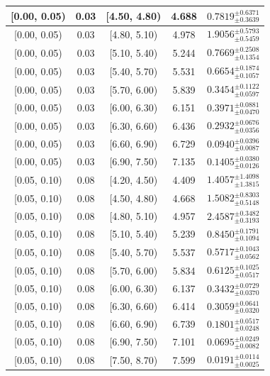\begin{longtable}{|c|c|c|c|c|}
\hline
\endlastfoot
[0.00, 0.05) & 0.03 & [4.50, 4.80) & 4.688 & $0.7819^{ \pm 0.6371 }_{ \pm 0.3639 }$ \\ 
\hline
[0.00, 0.05) & 0.03 & [4.80, 5.10) & 4.978 & $1.9056^{ \pm 0.5793 }_{ \pm 0.5459 }$ \\ 
\hline
[0.00, 0.05) & 0.03 & [5.10, 5.40) & 5.244 & $0.7669^{ \pm 0.2508 }_{ \pm 0.1354 }$ \\ 
\hline
[0.00, 0.05) & 0.03 & [5.40, 5.70) & 5.531 & $0.6654^{ \pm 0.1874 }_{ \pm 0.1057 }$ \\ 
\hline
[0.00, 0.05) & 0.03 & [5.70, 6.00) & 5.839 & $0.3454^{ \pm 0.1122 }_{ \pm 0.0597 }$ \\ 
\hline
[0.00, 0.05) & 0.03 & [6.00, 6.30) & 6.151 & $0.3971^{ \pm 0.0881 }_{ \pm 0.0470 }$ \\ 
\hline
[0.00, 0.05) & 0.03 & [6.30, 6.60) & 6.436 & $0.2932^{ \pm 0.0676 }_{ \pm 0.0356 }$ \\ 
\hline
[0.00, 0.05) & 0.03 & [6.60, 6.90) & 6.729 & $0.0940^{ \pm 0.0396 }_{ \pm 0.0087 }$ \\ 
\hline
[0.00, 0.05) & 0.03 & [6.90, 7.50) & 7.135 & $0.1405^{ \pm 0.0380 }_{ \pm 0.0126 }$ \\ 
\hline
[0.05, 0.10) & 0.08 & [4.20, 4.50) & 4.409 & $1.4057^{ \pm 1.4098 }_{ \pm 1.3815 }$ \\ 
\hline
[0.05, 0.10) & 0.08 & [4.50, 4.80) & 4.668 & $1.5082^{ \pm 0.8303 }_{ \pm 0.5148 }$ \\ 
\hline
[0.05, 0.10) & 0.08 & [4.80, 5.10) & 4.957 & $2.4587^{ \pm 0.3482 }_{ \pm 0.3193 }$ \\ 
\hline
[0.05, 0.10) & 0.08 & [5.10, 5.40) & 5.239 & $0.8450^{ \pm 0.1791 }_{ \pm 0.1094 }$ \\ 
\hline
[0.05, 0.10) & 0.08 & [5.40, 5.70) & 5.537 & $0.5717^{ \pm 0.1043 }_{ \pm 0.0562 }$ \\ 
\hline
[0.05, 0.10) & 0.08 & [5.70, 6.00) & 5.834 & $0.6125^{ \pm 0.1025 }_{ \pm 0.0517 }$ \\ 
\hline
[0.05, 0.10) & 0.08 & [6.00, 6.30) & 6.137 & $0.3432^{ \pm 0.0729 }_{ \pm 0.0370 }$ \\ 
\hline
[0.05, 0.10) & 0.08 & [6.30, 6.60) & 6.414 & $0.3059^{ \pm 0.0641 }_{ \pm 0.0320 }$ \\ 
\hline
[0.05, 0.10) & 0.08 & [6.60, 6.90) & 6.739 & $0.1801^{ \pm 0.0517 }_{ \pm 0.0248 }$ \\ 
\hline
[0.05, 0.10) & 0.08 & [6.90, 7.50) & 7.101 & $0.0695^{ \pm 0.0249 }_{ \pm 0.0082 }$ \\ 
\hline
[0.05, 0.10) & 0.08 & [7.50, 8.70) & 7.599 & $0.0191^{ \pm 0.0114 }_{ \pm 0.0025 }$ \\ 

\end{longtable}
